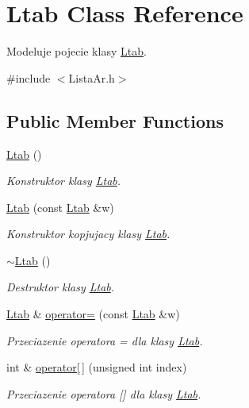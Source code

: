\hypertarget{class_ltab}{\section{Ltab Class Reference}
\label{class_ltab}
}


Modeluje pojecie klasy \hyperlink{class_ltab}{Ltab}.  




{\ttfamily \#include $<$Lista\-Ar.\-h$>$}

\subsection*{Public Member Functions}
\begin{DoxyCompactItemize}
\item 
\hyperlink{class_ltab_ab6cfd85d06ae19d676c3057dcd119541}{Ltab} ()
\begin{DoxyCompactList}\small\item\em Konstruktor klasy \hyperlink{class_ltab}{Ltab}. \end{DoxyCompactList}\item 
\hyperlink{class_ltab_a964bb07c6108ab0bcd31e4ae7d8ea35a}{Ltab} (const \hyperlink{class_ltab}{Ltab} \&w)
\begin{DoxyCompactList}\small\item\em Konstruktor kopjujacy klasy \hyperlink{class_ltab}{Ltab}. \end{DoxyCompactList}\item 
\hyperlink{class_ltab_af01a96400af8f3988c8a2800ce0eae22}{$\sim$\-Ltab} ()
\begin{DoxyCompactList}\small\item\em Destruktor klasy \hyperlink{class_ltab}{Ltab}. \end{DoxyCompactList}\item 
\hyperlink{class_ltab}{Ltab} \& \hyperlink{class_ltab_a174a5a31161a157d7724e560b99ad170}{operator=} (const \hyperlink{class_ltab}{Ltab} \&w)
\begin{DoxyCompactList}\small\item\em Przeciazenie operatora = dla klasy \hyperlink{class_ltab}{Ltab}. \end{DoxyCompactList}\item 
int \& \hyperlink{class_ltab_a3e6dae99d55dcaf9ead923a5588c3d57}{operator\mbox{[}$\,$\mbox{]}} (unsigned int index)
\begin{DoxyCompactList}\small\item\em Przeciazenie operatora \mbox{[}\mbox{]} dla klasy \hyperlink{class_ltab}{Ltab}. \end{DoxyCompactList}\item 

\end{DoxyCompactItemize}

